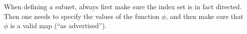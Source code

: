 \begin{boxwarning}
    When defining a subnet, always first make sure the index set is in fact directed. Then one needs to  specify the values of the function $\phi$, and then make sure that $\phi$ is a valid map (``as advertised'').
\end{boxwarning}

